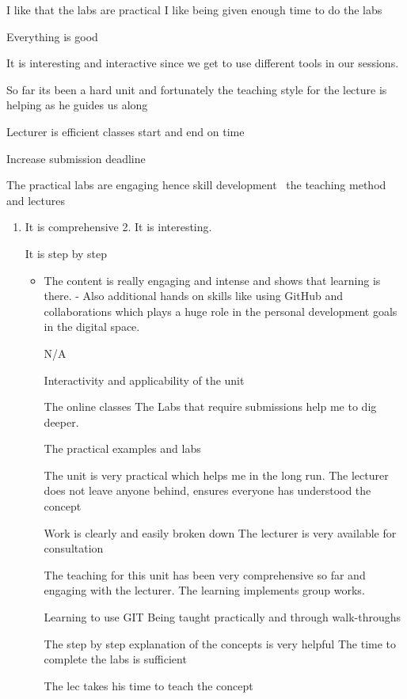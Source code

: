 \documentclass[
]{article}
\providecommand{\tightlist}{%
  \setlength{\itemsep}{0pt}\setlength{\parskip}{0pt}}
\begin{document}
I like that the labs are practical I like being given enough time to do
the labs

Everything is good

It is interesting and interactive since we get to use different tools in
our sessions.

So far its been a hard unit and fortunately the teaching style for the
lecture is helping as he guides us along~

Lecturer is efficient classes start and end on time

Increase submission deadline~

The practical labs are engaging hence skill development~ the teaching
method and lectures~

\begin{enumerate}
\def\labelenumi{\arabic{enumi}.}
\tightlist
\item
  It is comprehensive 2. It is interesting.

  It is step by step ~

  \begin{itemize}
  \tightlist
  \item
    The content is really engaging and intense and shows that learning
    is there. - Also additional hands on skills like using GitHub and
    collaborations which plays a huge role in the personal development
    goals in the digital space.~

    N/A

    Interactivity and applicability of the unit

    The online classes The Labs that require submissions help me to dig
    deeper.

    The practical examples and labs

    The unit is very practical which helps me in the long run. The
    lecturer does not leave anyone behind, ensures everyone has
    understood the concept

    Work is clearly and easily broken down The lecturer is very
    available for consultation

    The teaching for this unit has been very comprehensive so far and
    engaging with the lecturer. The learning implements group works.

    Learning to use GIT Being taught practically and through
    walk-throughs

    The step by step explanation of the concepts is very helpful The
    time to complete the labs is sufficient~

    The lec takes his time to teach the concept


\end{itemize}
\end{enumerate}
\end{document}
